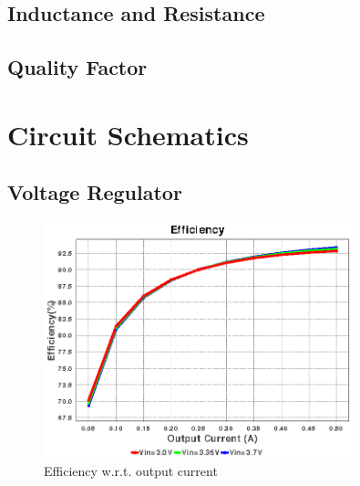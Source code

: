 \section{Inductance and Resistance}\label{sec:RL}




\section{Quality Factor}








\chapter{Circuit Schematics}

\section{Voltage Regulator}\label{Appendix: DC-DC}


\begin{figure}[htb]
	\begin{center}
		\includegraphics[width=0.8\textwidth]{./images/Efficiency_TPS61088}
	\caption{Efficiency w.r.t. output current}
	\end{center}
\end{figure}

